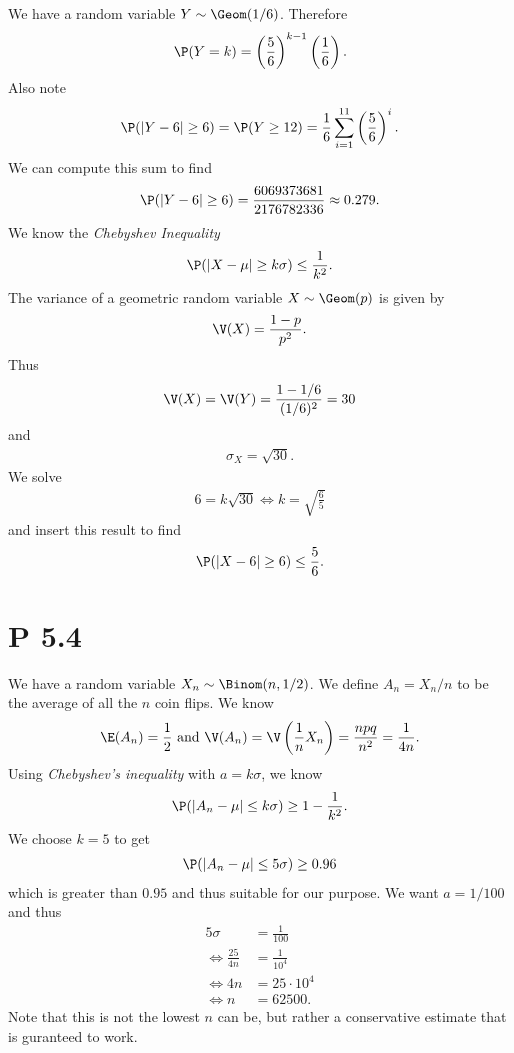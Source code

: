 \documentclass{article}
\begin{document}
We have a random variable $Y\sim\Geom(1/6)$. Therefore
\begin{align*}
  \P(Y=k) = \left(\frac{5}{6}\right)^{k-1}\left(\frac{1}{6}\right).
\end{align*}
Also note
\begin{align*}
  \P(|Y-6|\geq 6) = \P(Y \geq 12) = \frac{1}{6}\sum_{i=1}^{11} \left(\frac{5}{6}\right)^i.
\end{align*}
We can compute this sum to find
\begin{align*}
  \P(|Y-6|\geq 6) = \frac{6069373681}{2176782336} \approx 0.279.
\end{align*}
We know the \emph{Chebyshev Inequality}
\begin{align*}
  \P(|X-\mu|\geq k\sigma) \leq \frac{1}{k^2}.
\end{align*}
The variance of a geometric random variable $X\sim\Geom(p)$ is given by
\begin{align*}
  \V(X) = \frac{1-p}{p^2}.
\end{align*}
Thus
\begin{align*}
  \V(X) = \V(Y) = \frac{1-1/6}{(1/6)^2} = 30
\end{align*}
and
\begin{align*}
  \sigma_X = \sqrt{30}.
\end{align*}
We solve
\begin{align*}
  6 = k\sqrt{30} \Leftrightarrow k = \sqrt{\frac{6}{5}}
\end{align*}
and insert this result to find
\begin{align*}
  \P(|X-6| \geq 6) \leq \frac{5}{6}.
\end{align*}


\section*{P 5.4}


We have a random variable $X_n\sim\Binom(n,1/2)$. We define
$A_n = X_n / n$ to be the average of all the $n$ coin flips.
We know
\begin{align*}
  \E(A_n) = \frac{1}{2} \text{ and }
  \V(A_n) = \V\left(\frac{1}{n}X_n\right) = \frac{npq}{n^2} = \frac{1}{4n}.
\end{align*}
Using \emph{Chebyshev's inequality} with $a=k\sigma$, we know
\begin{align*}
  \P(|A_n - \mu| \leq k\sigma) \geq 1 - \frac{1}{k^2}.
\end{align*}
We choose $k=5$ to get
\begin{align*}
  \P(|A_n - \mu| \leq 5\sigma) \geq 0.96
\end{align*}
which is greater than $0.95$ and thus suitable for our purpose.
We want $a=1/100$ and thus
\begin{align*}
  5\sigma                       & = \frac{1}{100}  \\
  \Leftrightarrow \frac{25}{4n} & = \frac{1}{10^4} \\
  \Leftrightarrow 4n            & = 25\cdot 10^4   \\
  \Leftrightarrow n             & = 62500.
\end{align*}
Note that this is not the lowest $n$ can be, but rather a conservative
estimate that is guranteed to work.
\end{document}
